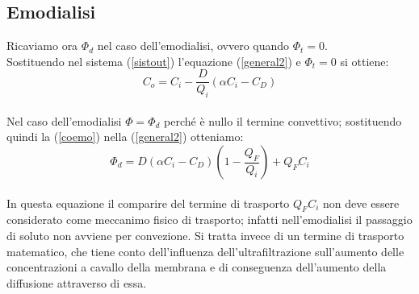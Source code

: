 \subsection{Emodialisi}
Ricaviamo ora $\Phi_d$ nel caso dell'emodialisi, ovvero quando $\Phi_t=0$.\\
Sostituendo nel sistema (\ref{sistout}) l'equazione (\ref{general2}) e $\Phi_t=0$ si ottiene:\\
\begin{equation}\label{coemo}
	C_o = C_i - \frac{D}{Q_i} (\alpha C_i - C_D)
\end{equation}\\
Nel caso dell'emodialisi $\Phi=\Phi_d$ perché è nullo il termine convettivo; sostituendo quindi la (\ref{coemo}) nella (\ref{general2}) otteniamo:
\begin{equation}\label{phidemo}
	\Phi_d = D (\alpha C_i - C_D)(1-\frac{Q_F}{Q_i}) + Q_F C_i
\end{equation}\\
In questa equazione il comparire del termine di trasporto $Q_F C_i$ non deve essere considerato come meccanimo fisico di trasporto; infatti nell'emodialisi il passaggio di soluto non avviene per convezione. Si tratta invece di un termine di trasporto matematico, che tiene conto dell'influenza dell'ultrafiltrazione sull'aumento delle concentrazioni a cavallo della membrana e di conseguenza dell'aumento della diffusione attraverso di essa.\\

